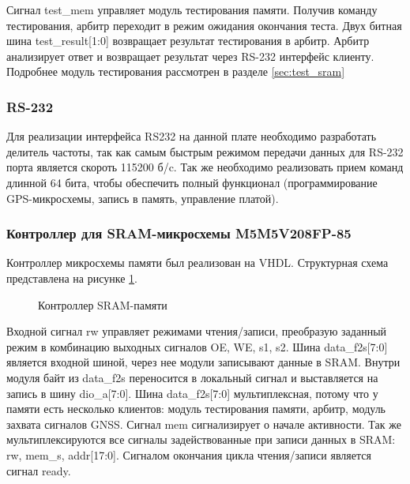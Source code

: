 Сигнал test\_mem управляет модуль тестирования памяти. Получив команду тестирования, арбитр переходит в режим ожидания окончания теста.
Двух битная шина test\_result[1:0] возвращает результат тестирования в арбитр. Арбитр анализирует ответ и возвращает результат 
через RS-232 интерфейс клиенту. Подробнее модуль тестирования рассмотрен в разделе \ref{sec:test_sram}

\subsubsection{RS-232}
\label{sec:rs232}
Для реализации интерфейса RS232 на данной плате необходимо разработать делитель частоты, так как самым быстрым режимом передачи данных
для RS-232 порта является скороть 115200 б/c. Так же необходимо реализовать прием команд длинной 64 бита, чтобы обеспечить
полный функционал (программирование GPS-микросхемы, запись в память, управление платой).

\subsubsection{Контроллер для SRAM-микросхемы M5M5V208FP-85}
\label{sec:sram_controller}
Контроллер микросхемы памяти был реализован на VHDL. Структурная схема представлена на рисунке \ref{pic:sram_arch}.

\begin{figure}[H]
\begin{center}
\end{center}
\caption{Контроллер SRAM-памяти}
\label{pic:sram_arch}
\end{figure}

Входной сигнал rw управляет режимами чтения/записи, преобразую заданный режим в комбинацию выходных сигналов OE, WE, s1, s2.
Шина data\_f2s[7:0] является входной шиной, через нее модули записывают данные в SRAM. Внутри модуля байт из data\_f2s
переносится в локальный сигнал и выставляется на запись в шину dio\_a[7:0]. Шина data\_f2s[7:0] мультиплексная, потому что 
у памяти есть несколько клиентов: модуль тестирования памяти, арбитр, модуль захвата сигналов GNSS. Сигнал mem сигнализирует о начале
активности. Так же мультиплексируются все сигналы задействованные при записи данных в SRAM: rw, mem\_s, addr[17:0]. Сигналом окончания
цикла чтения/записи является сигнал ready.

